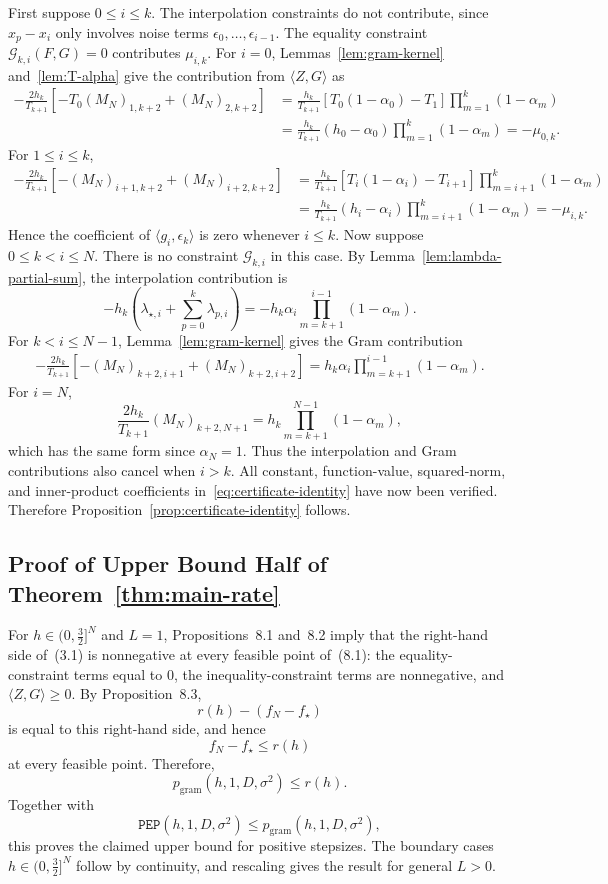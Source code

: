 First suppose $0\le i\le k$. The interpolation constraints do not contribute, since $x_p-x_i$ only involves noise terms $\epsilon_0,\ldots,\epsilon_{i-1}$. The equality constraint $\mathcal G_{k,i}(F,G)=0$ contributes $\mu_{i,k}$. For $i=0$, Lemmas~\ref{lem:gram-kernel} and~\ref{lem:T-alpha} give the contribution from $\langle Z,G\rangle$ as
\[ \begin{aligned}
-\frac{2h_k}{T_{k+1}}\left[-T_0(M_N)_{1,k+2}+(M_N)_{2,k+2}\right]
&=\frac{h_k}{T_{k+1}}\left[T_0(1-\alpha_0)-T_1\right]\prod_{m=1}^{k}(1-\alpha_m)\\
&=\frac{h_k}{T_{k+1}}(h_0-\alpha_0)\prod_{m=1}^{k}(1-\alpha_m)
=-\mu_{0,k}.
\end{aligned} \]
For $1\le i\le k$,
\[ \begin{aligned}
-\frac{2h_k}{T_{k+1}}\left[-(M_N)_{i+1,k+2}+(M_N)_{i+2,k+2}\right]
&=\frac{h_k}{T_{k+1}}\left[T_i(1-\alpha_i)-T_{i+1}\right]\prod_{m=i+1}^{k}(1-\alpha_m)\\
&=\frac{h_k}{T_{k+1}}(h_i-\alpha_i)\prod_{m=i+1}^{k}(1-\alpha_m)
=-\mu_{i,k}.
\end{aligned} \]
Hence the coefficient of $\langle g_i,\epsilon_k\rangle$ is zero whenever $i\le k$.
Now suppose $0\le k<i\le N$. There is no constraint $\mathcal G_{k,i}$ in this case. By Lemma~\ref{lem:lambda-partial-sum}, the interpolation contribution is
\[ -h_k\left(\lambda_{\star,i}+\sum_{p=0}^{k}\lambda_{p,i}\right)
=-h_k\alpha_i\prod_{m=k+1}^{i-1}(1-\alpha_m). \]
For $k<i\le N-1$, Lemma~\ref{lem:gram-kernel} gives the Gram contribution
\[ \begin{aligned}
-\frac{2h_k}{T_{k+1}}\left[-(M_N)_{k+2,i+1}+(M_N)_{k+2,i+2}\right]
=h_k\alpha_i\prod_{m=k+1}^{i-1}(1-\alpha_m).
\end{aligned} \]
For $i=N$,
\[ \frac{2h_k}{T_{k+1}}(M_N)_{k+2,N+1}
=h_k\prod_{m=k+1}^{N-1}(1-\alpha_m), \]
which has the same form since $\alpha_N=1$. Thus the interpolation and Gram contributions also cancel when $i>k$.
All constant, function-value, squared-norm, and inner-product coefficients in~\eqref{eq:certificate-identity} have now been verified. Therefore Proposition~\ref{prop:certificate-identity} follows.
\subsection{Proof of Upper Bound Half of Theorem~\ref{thm:main-rate}}
For $h\in(0,\frac{3}{2}]^N$ and $L=1$, Propositions~8.1 and~8.2 imply that
the right-hand side of~(3.1) is nonnegative at every feasible point
of~(8.1): the equality-constraint terms equal to 0, the inequality-constraint terms are nonnegative, and $\langle Z,G\rangle\ge0$.
By Proposition~8.3,
\[r(h)-(f_N-f_\star)\]
is equal to this right-hand side, and hence
\[f_N-f_\star\le r(h)\]
at every feasible point. Therefore,
\[p_{\mathrm{gram}}(h,1,D,\sigma^2)\le r(h).\]
Together with
\[\mathtt{PEP}(h,1,D,\sigma^2) \le p_{\mathrm{gram}}(h,1,D,\sigma^2), \]
this proves the claimed upper bound for positive stepsizes.
The boundary cases $h\in(0,\frac{3}{2}]^N$ follow by continuity, and rescaling gives the result for general $L>0$.



